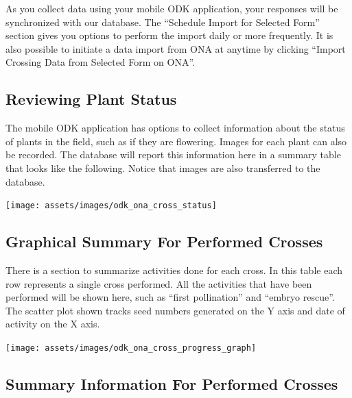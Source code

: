 \documentclass[
  12pt,
]{book}
\begin{document}
As you collect data using your mobile ODK application, your responses will be synchronized with our database. The ``Schedule Import for Selected Form'' section gives you options to perform the import daily or more frequently. It is also possible to initiate a data import from ONA at anytime by clicking ``Import Crossing Data from Selected Form on ONA''.

\hypertarget{reviewing-plant-status}{%
\subsection{Reviewing Plant Status}\label{reviewing-plant-status}}

The mobile ODK application has options to collect information about the status of plants in the field, such as if they are flowering. Images for each plant can also be recorded. The database will report this information here in a summary table that looks like the following. Notice that images are also transferred to the database.

\begin{center}\texttt{[image: assets/images/odk\_ona\_cross\_status]} \end{center}

\hypertarget{graphical-summary-for-performed-crosses}{%
\subsection{Graphical Summary For Performed Crosses}\label{graphical-summary-for-performed-crosses}}

There is a section to summarize activities done for each cross. In this table each row represents a single cross performed. All the activities that have been performed will be shown here, such as ``first pollination'' and ``embryo rescue''. The scatter plot shown tracks seed numbers generated on the Y axis and date of activity on the X axis.

\begin{center}\texttt{[image: assets/images/odk\_ona\_cross\_progress\_graph]} \end{center}

\hypertarget{summary-information-for-performed-crosses}{%
\subsection{Summary Information For Performed Crosses}\label{summary-information-for-performed-crosses}}
\end{document}
